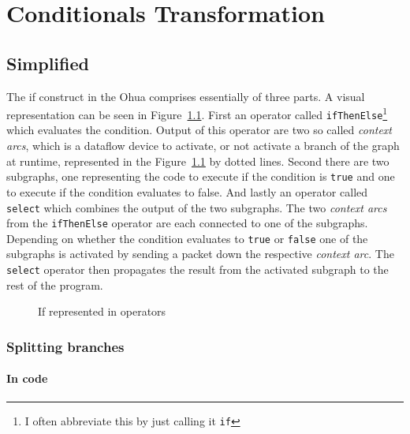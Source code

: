 \chapter{Conditionals Transformation}

\label{ch:if-transformation}

\newcommand{\opite}{\texttt{ifThenElse}}
\newcommand{\opselect}{\texttt{select}}


\section{Simplified}


The if construct in the Ohua comprises essentially of three parts.
A visual representation can be seen in Figure~\ref{fig:if-in-operators}.
First an operator called \texttt{ifThenElse}\footnote{I often abbreviate this by just calling it \texttt{if}} which evaluates the condition.
Output of this operator are two so called \emph{context arcs}, which is a dataflow device to activate, or not activate a branch of the graph at runtime, represented in the Figure~\ref{fig:if-in-operators} by dotted lines.
Second there are two subgraphs, one representing the code to execute if the condition is \texttt{true} and one to execute if the condition evaluates to false.
And lastly an operator called \texttt{select} which combines the output of the two subgraphs.
The two \emph{context arcs} from the \texttt{ifThenElse} operator are each connected to one of the subgraphs.
Depending on whether the condition evaluates to \texttt{true} or \texttt{false} one of the subgraphs is activated by sending a packet down the respective \emph{context arc}.
The \texttt{select} operator then propagates the result from the activated subgraph to the rest of the program.

\begin{figure}
  \caption{If represented in operators}
  \label{fig:if-in-operators}
\end{figure}

\subsection{Splitting branches}

\subsubsection{In code}

